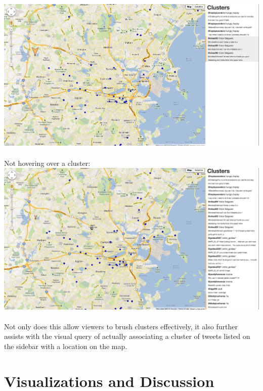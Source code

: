\documentclass[pdftex,12pt,a4paper]{article}
\begin{document}
\includegraphics[width=5.5in]{hover1.png} \\ \\
Not hovering over a cluster: \\ 
\includegraphics[width=5.5in]{hover2.png} \\ \\
Not only does this allow viewers to brush clusters effectively, it also further assists with the visual query of actually associating a cluster of tweets listed on the sidebar with a location on the map.

\section{Visualizations and Discussion} 
\end{document}
